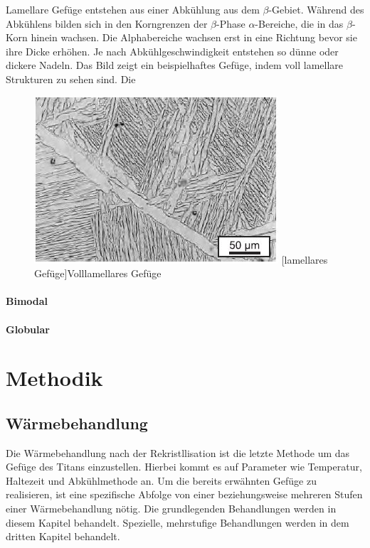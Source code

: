 \documentclass[a4paper, singlepage, 11pt]{tubsreprt}
\begin{document}
Lamellare Gefüge entstehen aus einer Abkühlung aus dem $\beta$-Gebiet. Während des Abkühlens bilden sich in den Korngrenzen der $\beta$-Phase $\alpha$-Bereiche, die in das $\beta$-Korn hinein wachsen. Die Alphabereiche wachsen erst in eine Richtung bevor sie ihre Dicke erhöhen. Je nach Abkühlgeschwindigkeit entstehen so dünne oder dickere Nadeln. Das Bild zeigt ein beispielhaftes Gefüge, indem voll lamellare Strukturen zu sehen sind. Die 

\begin{figure}


	\centering
		\includegraphics[scale=1]{Bilder/lamellar.jpg}
		[lamellares Gefüge]{Volllamellares Gefüge \cite{Leyens2002}}
		\label{fig1}
		
\end{figure}

\subsubsection{Bimodal}
\subsubsection{Globular}
\chapter{Methodik}
\section{Wärmebehandlung}

Die Wärmebehandlung nach der Rekristllisation ist die letzte Methode um das Gefüge des Titans einzustellen. Hierbei kommt es auf Parameter wie Temperatur, Haltezeit und Abkühlmethode an. Um die bereits erwähnten Gefüge zu realisieren, ist eine spezifische Abfolge von einer beziehungsweise mehreren Stufen einer Wärmebehandlung nötig. Die grundlegenden Behandlungen werden in diesem Kapitel behandelt. Spezielle, mehrstufige Behandlungen werden in dem dritten Kapitel behandelt.
\end{document}
